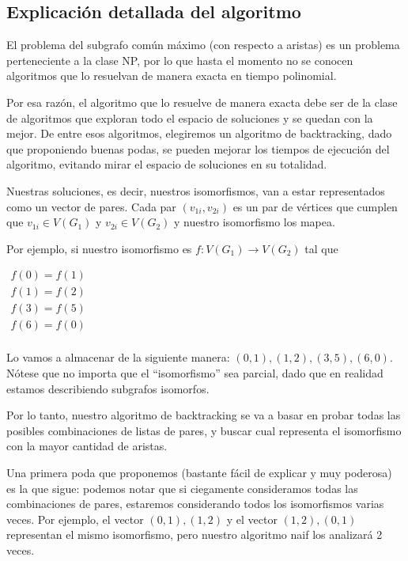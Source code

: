 \subsection{Explicación detallada del algoritmo}

El problema del subgrafo común máximo (con respecto a aristas) es un problema perteneciente a la clase NP, por lo que hasta el momento no se conocen algoritmos que lo resuelvan de manera exacta en tiempo polinomial. 

Por esa razón, el algoritmo que lo resuelve de manera exacta debe ser de la clase de algoritmos que exploran todo el espacio de soluciones y se quedan con la mejor. De entre esos algoritmos, elegiremos un algoritmo de backtracking, dado que proponiendo buenas podas, se pueden mejorar los tiempos de ejecución del algoritmo, evitando mirar el espacio de soluciones en su totalidad.

Nuestras soluciones, es decir, nuestros isomorfismos, van a estar representados como un vector de pares. Cada par $(v_{1i}, v_{2i})$ es un par de vértices que cumplen que $v_{1i} \in V(G_1)$ y $v_{2i} \in V(G_2)$ y nuestro isomorfismo los mapea. 

Por ejemplo, si nuestro isomorfismo es $f : V(G_1) \to V(G_2)$ tal que

$
\begin{matrix}
f(0) = f(1) \\
f(1) = f(2) \\
f(3) = f(5) \\
f(6) = f(0) \\
\end{matrix}
$

Lo vamos a almacenar de la siguiente manera: ${(0,1), (1,2), (3,5), (6,0)}$. Nótese que no importa que el ``isomorfismo'' sea parcial, dado que en realidad estamos describiendo subgrafos isomorfos.

Por lo tanto, nuestro algoritmo de backtracking se va a basar en probar todas las posibles combinaciones de listas de pares, y buscar cual representa el isomorfismo con la mayor cantidad de aristas. 

Una primera poda que proponemos (bastante fácil de explicar y muy poderosa) es la que sigue: podemos notar que si ciegamente consideramos todas las combinaciones de pares, estaremos considerando todos los isomorfismos varias veces.
Por ejemplo, el vector ${(0,1), (1,2)}$ y el vector ${(1,2), (0,1)}$ representan el mismo isomorfismo, pero nuestro algoritmo naif los analizará 2 veces.

